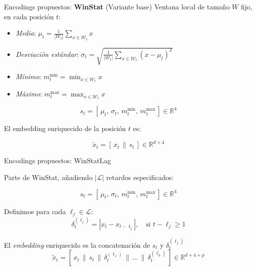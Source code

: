 \documentclass[compress]{beamer}
\begin{document}
	\begin{frame}{Encodings propuestos: \textbf{WinStat} (Variante base)}
	Ventana local de tamaño $W$ fijo, en cada posición $t$:
	
	\begin{itemize}
		\item \textit{Media}: $\mu_t = \frac{1}{|\mathcal{W}_t|} \sum_{x \in \mathcal{W}_t} x$
		\item \textit{Desviación estándar}: $\sigma_t = \sqrt{ \frac{1}{|\mathcal{W}_t|} \sum_{x \in \mathcal{W}_t} (x - \mu_t)^2 }$
		\item \textit{Mínimo}: $m^{\min}_t = \min_{x \in \mathcal{W}_t} x$
		\item \textit{Máximo}: $m^{\max}_t = \max_{x \in \mathcal{W}_t} x$
	\end{itemize}
	
	\[
	s_t = [\,\mu_t,\, \sigma_t,\, m^{\min}_t,\, m^{\max}_t\,] \in \mathbb{R}^{4}
	\]
	
	El embedding enriquecido de la posición $t$ es:
	
	\[
	\tilde{x}_t = [\,x_t \, \| \, s_t\,] \in \mathbb{R}^{d+4}
	\]
	
	\end{frame}
	
	\begin{frame}{Encodings propuestos: WinStatLag}
		
	Parte de WinStat, añadiendo $|\mathcal{L}|$ retardos especificados:
	
	\[
	s_t = [\,\mu_t,\, \sigma_t,\, m^{\min}_t,\, m^{\max}_t\,] \in \mathbb{R}^4
	\]
	
	Definimos para cada $\ell_j \in \mathcal{L}$:
	\[
	\delta_t^{(\ell_j)} = | x_t - x_{t - \ell_j}|, \quad \text{si } t - \ell_j \geq 1
	\]
	
	El \textit{embedding} enriquecido es la concatenación de $s_t$ y $\delta_t^{(\ell_j)}$
	\[
	\tilde{x}_t = [\,x_t \,\|\, s_t \,\|\, \delta_t^{(\ell_1)} \,\|\, \dots \,\|\, \delta_t^{(\ell_p)}\,] \in \mathbb{R}^{d + 4 + p}
	\]

	
	\end{frame}
	
\end{document}
